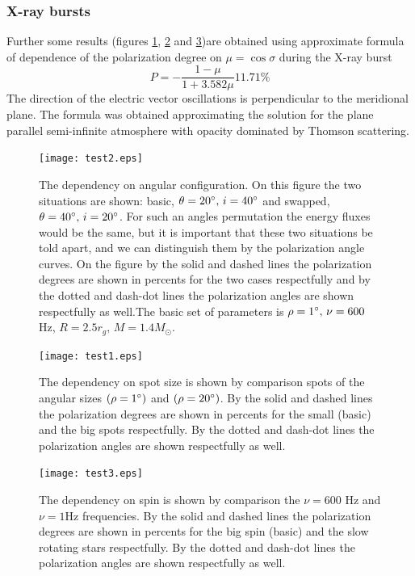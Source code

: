 \documentclass[iop, usenatbib]{emulateapj}
\newcommand{\be}{\begin{equation}}
\newcommand{\ee}{\end{equation}}
\begin{document}
\subsubsection{X-ray bursts}
Further some results (figures \ref{figure:angswap}, \ref{figure:sizedif} and \ref{figure:freqdif})are obtained using approximate formula of dependence of the polarization degree on $\mu=\cos{\sigma}$  during the X-ray burst
\be
P=-\frac{1-\mu}{1+3.582\mu}11.71\%
\ee
The direction of the electric vector oscillations is perpendicular to the meridional plane.
The formula was obtained approximating the solution for the plane parallel semi-infinite atmosphere with opacity dominated by Thomson scattering.

\begin{figure} 
 \centering
 \texttt{[image: test2.eps]}
 \caption{The dependency on angular configuration. On this figure the two situations are shown: basic, $\theta=20\degree,\, i=40\degree$ and swapped, $\theta=40\degree,\, i=20\degree$. For such an angles permutation the energy fluxes would be the same, but it is important that these two situations be told apart, and we can distinguish them by the polarization angle curves. On the figure by the solid and dashed lines the polarization degrees are shown in percents for the two cases respectfully and by the dotted and dash-dot lines the polarization angles are shown respectfully as well.The basic set of parameters is $\rho=1\degree,\, \nu = 600$ Hz, $ R=2.5 r_g ,\, M=1.4 M_{\odot}$.  }
 \label{figure:angswap}
\end{figure}

\begin{figure}
 \centering 
 \texttt{[image: test1.eps]}
 \caption{The dependency on spot size is shown by comparison spots of the angular sizes $(\rho=1\degree)$ and $(\rho=20\degree)$.  By the solid and dashed lines the polarization degrees are shown in percents  for  the small (basic) and the big spots respectfully. By the dotted and dash-dot lines the polarization angles are shown respectfully as well.}
 \label{figure:sizedif}
\end{figure}
 

\begin{figure}
 \centering
 \texttt{[image: test3.eps]}
 \caption{The dependency on spin is shown by comparison the $\nu=600$ Hz and $\nu=1$Hz frequencies. By the solid and dashed lines the polarization degrees are shown in percents for the big spin (basic) and the slow rotating stars respectfully.    By the dotted and dash-dot lines the polarization angles are shown respectfully as well.}
 \label{figure:freqdif}
\end{figure}
\end{document}
